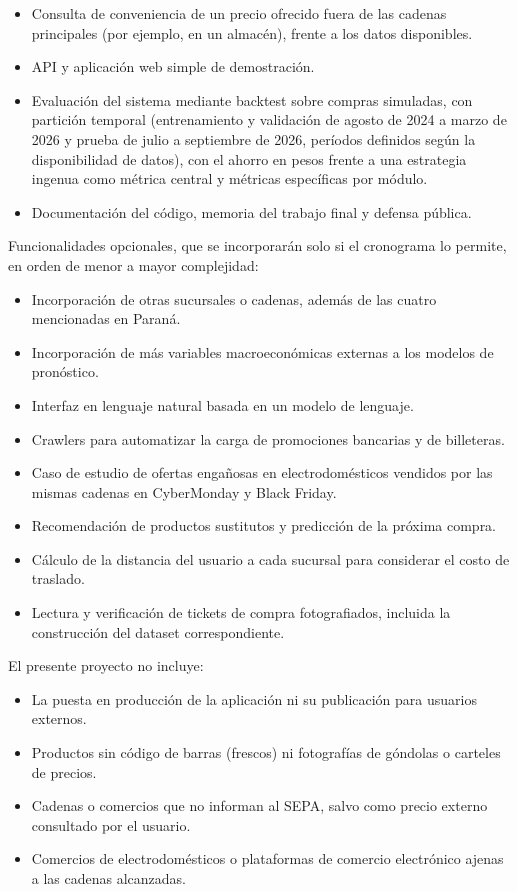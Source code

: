 \documentclass[
11pt, %
]{charter}
\begin{document}
\begin{itemize}
	\item Consulta de conveniencia de un precio ofrecido fuera de las cadenas principales (por ejemplo, en un almacén), frente a los datos disponibles.
	\item API y aplicación web simple de demostración.
	\item Evaluación del sistema mediante backtest sobre compras simuladas, con partición temporal (entrenamiento y validación de agosto de 2024 a marzo de 2026 y prueba de julio a septiembre de 2026, períodos definidos según la disponibilidad de datos), con el ahorro en pesos frente a una estrategia ingenua como métrica central y métricas específicas por módulo.
	\item Documentación del código, memoria del trabajo final y defensa pública.
\end{itemize}

Funcionalidades opcionales, que se incorporarán solo si el cronograma lo permite, en orden de menor a mayor complejidad:

\begin{itemize}
	\item Incorporación de otras sucursales o cadenas, además de las cuatro mencionadas en Paraná.
	\item Incorporación de más variables macroeconómicas externas a los modelos de pronóstico.
	\item Interfaz en lenguaje natural basada en un modelo de lenguaje.
	\item Crawlers para automatizar la carga de promociones bancarias y de billeteras.
	\item Caso de estudio de ofertas engañosas en electrodomésticos vendidos por las mismas cadenas en CyberMonday y Black Friday.
	\item Recomendación de productos sustitutos y predicción de la próxima compra.
	\item Cálculo de la distancia del usuario a cada sucursal para considerar el costo de traslado.
	\item Lectura y verificación de tickets de compra fotografiados, incluida la construcción del dataset correspondiente.
\end{itemize}

El presente proyecto no incluye:

\begin{itemize}
	\item La puesta en producción de la aplicación ni su publicación para usuarios externos.
	\item Productos sin código de barras (frescos) ni fotografías de góndolas o carteles de precios.
	\item Cadenas o comercios que no informan al SEPA, salvo como precio externo consultado por el usuario.
	\item Comercios de electrodomésticos o plataformas de comercio electrónico ajenas a las cadenas alcanzadas.
\end{itemize}
\end{document}
